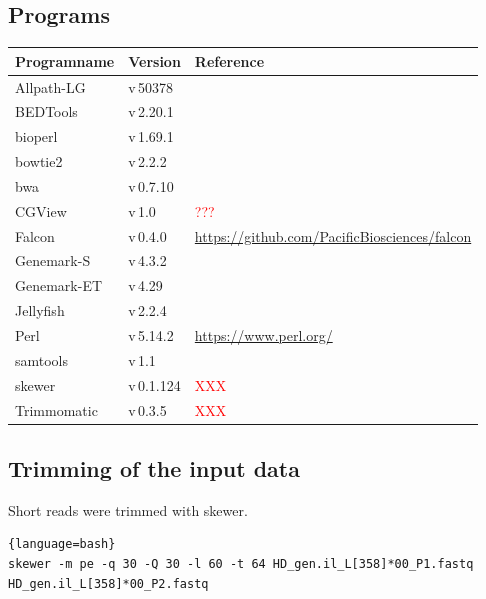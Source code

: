 \documentclass[12pt,a4paper]{scrartcl}
\begin{document}
\subsection*{Programs}

\begin{tabularx}{\linewidth}{llX}\toprule
Programname & Version & Reference \\ \midrule
Allpath-LG  & v\,50378 & \textcite{Gnerre2011, Ribeiro2012} \\
BEDTools    & v\,2.20.1 & \textcite{Quinlan2010} \\
bioperl     & v\,1.69.1 & \textcite{Stajich2002} \\
bowtie2     & v\,2.2.2 & \textcite{Langmead2012} \\
bwa         & v\,0.7.10 & \textcite{Li2009a,Li2010} \\
CGView      & v\,1.0 & \textcite{Grin2011} \textcolor{red}{???} \\
Falcon      & v\,0.4.0 & \url{https://github.com/PacificBiosciences/falcon} \\
Genemark-S  & v\,4.3.2 & \textcite{Besemer2001} \\
Genemark-ET & v\,4.29 & \textcite{Lomsadze2014} \\
Jellyfish   & v\,2.2.4  & \textcite{Marcais2011} \\
Perl        & v\,5.14.2  & \url{https://www.perl.org/} \\
samtools    & v\,1.1 & \textcite{Li2009b, Li2011a, Li2011b} \\
skewer      & v\,0.1.124 & \textcolor{red}{XXX} \\
Trimmomatic & v\,0.3.5 & \textcolor{red}{XXX} \\
\end{tabularx}

\subsection*{Trimming of the input data}

Short reads were trimmed with skewer.

\begin{lstlisting}{language=bash}
skewer -m pe -q 30 -Q 30 -l 60 -t 64 HD_gen.il_L[358]*00_P1.fastq HD_gen.il_L[358]*00_P2.fastq
\end{lstlisting}
\end{document}
